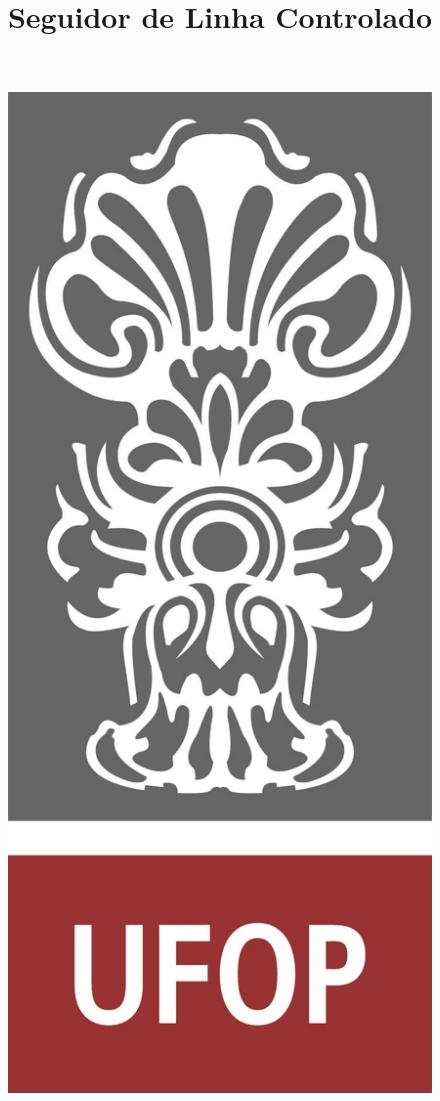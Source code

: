\documentclass[portugues, brazil, a4paper,12pt]{article}
\title{Seguidor de Linha Controlado}
\begin{document}
\begin{titlepage}

  \vfill

	\begin{figure}[H]
	\centering
		\includegraphics[scale=0.15]{img/logo-ufop.jpg}
	\end{figure}
  \vfill


\end{titlepage}
\end{document}
